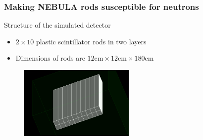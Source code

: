 \begin{frame}
\frametitle{Making NEBULA rods susceptible for neutrons}

\begin{exampleblock}{Structure of the simulated detector}
	\begin{itemize}
		\item $2 \times 10$ plastic scintillator rods in two layers
		\item Dimensions of rods are $12\text{cm} \times 12\text{cm} \times 180\text{cm}$
	\end{itemize}
\end{exampleblock}

\begin{figure}
	\includegraphics[width=0.5\textwidth]{images/nebula.png}
\end{figure}


\end{frame}